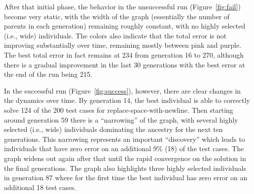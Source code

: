 \documentclass{sig-alternate}
\begin{document}
After that initial phase, the behavior in the unsuccessful run (Figure~\ref{fig:fail}) become very static, with the width of the graph (essentially the number of parents in each generation) remaining roughly constant, with no highly selected (i.e., wide) individuals. The colors also indicate that the total error is not improving substantially over time, remaining mostly between pink and purple. The best total error in fact remains at 234 from generation 16 to 270, although there is a gradual improvement in the last 30 generations with the best error at the end of the run being 215.

In the successful run (Figure~\ref{fig:success}), however, there are clear changes in the dynamics over time. By generation 14, the best individual is able to correctly solve 124 of the 200 test cases for replace-space-with-newline. Then starting around generation 59 there is a ``narrowing'' of the graph, with several highly selected (i.e., wide) individuals dominating the ancestry for the next ten generations. This narrowing represents an important ``discovery'' which leads to individuals that have zero error on an additional 9\% (18) of the test cases. The graph widens out again after that until the rapid convergence on the solution in the final generations. The graph also highlights three highly selected individuals in generation 87 where for the first time the best individual has zero error on an additional 18 test cases.



\end{document}
